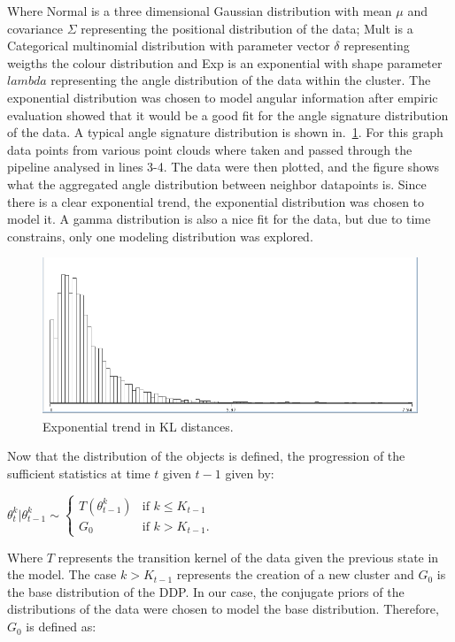 \documentclass[twoside,hidelinks]{article}
\begin{document}
Where Normal is a three dimensional Gaussian distribution with mean $\mu$ and covariance $\Sigma$ representing the positional distribution of the data; Mult is a Categorical multinomial distribution with parameter vector $\delta$ representing weigths the colour distribution and Exp is an exponential with shape parameter $lambda$ representing the angle distribution of the data within the cluster. The exponential distribution was chosen to model angular information after empiric evaluation showed that it would be a good fit for the angle signature distribution of the data. A typical angle signature distribution is shown in.~\ref{pcl:kl}. For this graph data points from various point clouds where taken and passed through the pipeline analysed in lines 3-4. The data were then plotted, and the figure shows what the aggregated angle distribution between neighbor datapoints is. Since there is a clear exponential trend, the exponential distribution was chosen to model it. A gamma distribution is also a nice fit for the data, but due to time constrains, only one modeling    distribution was explored.

\begin{figure}[h!]
  \centering
    \includegraphics[width=.5\textwidth]{Kullback-Leibler}
    \caption{Exponential trend in KL distances.}
  \label{pcl:kl}
\end{figure}


Now that the distribution of the objects is defined, the progression of the sufficient statistics at time $t$ given $t-1$ given by:

$\theta_t^k | \theta_{t-1}^k \sim
\begin{cases} T (\theta_{t-1}^k) &\mbox{if } k \leq K_{t-1} \\
G_0 & \mbox{if } k > K_{t-1}. \end{cases}$

Where $T$ represents the transition kernel of the data given the previous state in the model. The case $ k > K_{t-1} $ represents the creation of a new cluster and $G_0$ is the base distribution of the DDP. In our case, the conjugate priors of the distributions of the data were chosen to model the base distribution. Therefore, $G_0$ is defined as:
\end{document}
